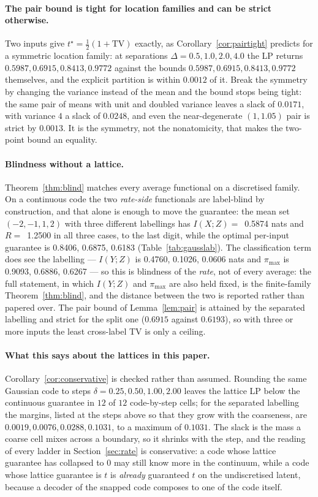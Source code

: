 \documentclass[11pt]{article}
\begin{document}
\paragraph{The pair bound is tight for location families and can be strict otherwise.}
Two inputs give $t^\star=\tfrac12(1+\mathrm{TV})$ exactly, as Corollary~\ref{cor:pairtight}
predicts for a symmetric location family: at separations $\Delta=0.5, 1.0, 2.0, 4.0$ the LP returns $0.5987, 0.6915, 0.8413, 0.9772$
against the bounds $0.5987, 0.6915, 0.8413, 0.9772$ themselves, and the explicit partition is within $0.0012$ of it.
Break the symmetry by changing the variance instead of the mean and the bound stops being tight:
the same pair of means with unit and doubled variance leaves a slack of $0.0171$, with variance $4$
a slack of $0.0248$, and even the near-degenerate $(1,1.05)$ pair is strict by $0.0013$. It is the
symmetry, not the nonatomicity, that makes the two-point bound an equality.

\paragraph{Blindness without a lattice.}
Theorem~\ref{thm:blind} matches every average functional on a discretised family. On a continuous
code the two \emph{rate-side} functionals are label-blind by construction, and that alone is
enough to move the guarantee: the mean set $(-2,-1,1,2)$ with three different labellings has
$I(X;Z)=$~0.5874 nats and $R=$~1.2500 in all three cases, to the last digit, while the optimal
per-input guarantee is 0.8406, 0.6875, 0.6183 (Table~\ref{tab:gausslab}). The classification term does see the
labelling --- $I(Y;Z)$ is 0.4760, 0.1026, 0.0606 nats and $\pi_{\max}$ is 0.9093, 0.6886, 0.6267 --- so this is blindness of
the \emph{rate}, not of every average: the full statement, in which $I(Y;Z)$ and $\pi_{\max}$ are
also held fixed, is the finite-family Theorem~\ref{thm:blind}, and the distance between the two is
reported rather than papered over. The pair bound of Lemma~\ref{lem:pair} is attained by the
separated labelling and strict for the split one ($0.6915$ against $0.6193$), so with
three or more inputs the least cross-label TV is only a ceiling.

\paragraph{What this says about the lattices in this paper.}
Corollary~\ref{cor:conservative} is checked rather than assumed. Rounding the same Gaussian code to
steps $\delta=0.25, 0.50, 1.00, 2.00$ leaves the lattice LP below the continuous guarantee in $12$ of
$12$ code-by-step cells; for the separated labelling the margins, listed at the steps above
so that they grow with the coarseness, are $0.0019, 0.0076, 0.0288, 0.1031$, to a maximum of $0.1031$. The slack is the
mass a
coarse cell mixes across a boundary, so it shrinks with the step, and the reading of every ladder in
Section~\ref{sec:rate} is conservative: a code whose lattice guarantee has collapsed to $0$ may still
know more in the continuum, while a code whose lattice guarantee is $t$ is \emph{already} guaranteed
$t$ on the undiscretised latent, because a decoder of the snapped code composes to one of the code
itself.
\end{document}
